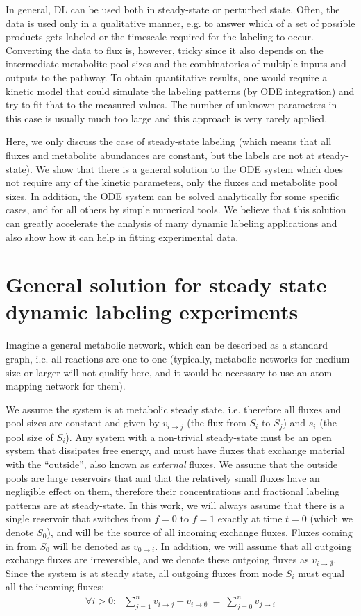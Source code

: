 \documentclass{article}
\newcommand{\flux}[2]{\ensuremath{v_{{#1} \rightarrow {#2}}}}
\begin{document}
In general, DL can be used both in steady-state or perturbed state. Often, the data is used only in a qualitative manner, e.g. to answer which of a set of possible products gets labeled or the timescale required for the labeling to occur. Converting the data to flux is, however, tricky since it also depends on the intermediate metabolite pool sizes and the combinatorics of multiple inputs and outputs to the pathway. To obtain quantitative results, one would require a kinetic model that could simulate the labeling patterns (by ODE integration) and try to fit that to the measured values. The number of unknown parameters in this case is usually much too large and this approach is very rarely applied.

Here, we only discuss the case of steady-state labeling (which means that all fluxes and metabolite abundances are constant, but the labels are not at steady-state). We show that there is a general solution to the ODE system which does not require any of the kinetic parameters, only the fluxes and metabolite pool sizes. In addition, the ODE system can be solved analytically for some specific cases, and for all others by simple numerical tools. We believe that this solution can greatly accelerate the analysis of many dynamic labeling applications and also show how it can help in fitting experimental data.


\section{General solution for steady state dynamic labeling experiments}
Imagine a general metabolic network, which can be described as a standard graph, i.e. all reactions are one-to-one (typically, metabolic networks for medium size or larger will not qualify here, and it would be necessary to use an atom-mapping network for them).

We assume the system is at metabolic steady state, i.e. therefore all fluxes and pool sizes are constant and given by \flux{i}{j} (the flux from $S_i$ to $S_j$) and $s_i$ (the pool size of $S_i$). Any system with a non-trivial steady-state must be an open system that dissipates free energy, and must have fluxes that exchange material with the ``outside'', also known as \textit{external} fluxes. We assume that the outside pools are large reservoirs that and that the relatively small fluxes have an negligible effect on them, therefore their concentrations and fractional labeling patterns are at steady-state. In this work, we will always assume that there is a single reservoir that switches from $f=0$ to $f=1$ exactly at time $t=0$ (which we denote $S_0$), and will be the source of all incoming exchange fluxes. Fluxes coming in from $S_0$ will be denoted as $\flux{0}{i}$. In addition, we will assume that all outgoing exchange fluxes are irreversible, and we denote these outgoing fluxes as $\flux{i}{\emptyset}$. Since the system is at steady state, all outgoing fluxes from node $S_i$ must equal all the incoming fluxes:
\begin{eqnarray}
	\forall i > 0: ~~~ \sum_{j=1}^{n} \flux{i}{j} + \flux{i}{\emptyset} ~=~ \sum_{j=0}^{n} \flux{j}{i}
\end{eqnarray}
\end{document}
